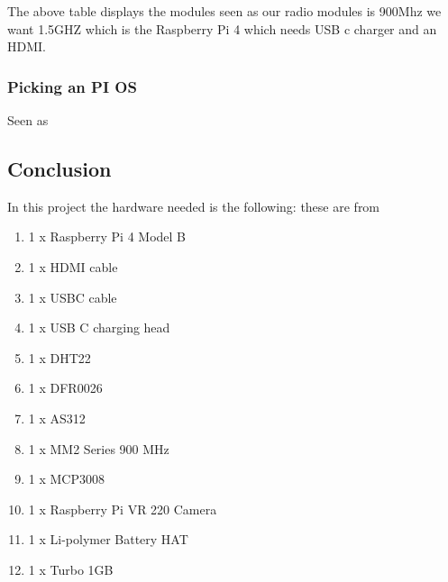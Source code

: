 The above table displays the modules seen as our radio modules is 900Mhz  we want  1.5GHZ which is the Raspberry Pi 4  which needs USB\- c charger and an HDMI.
\subsubsection{Picking an PI OS}
\label{pi os}
Seen as 
\subsection{Conclusion}
In this project the hardware needed is the  following: these are from 
\begin{enumerate}
	\item 1 x Raspberry Pi 4 Model B 
	\item 1 x HDMI cable
	\item 1 x USB\-C cable
	\item 1 x USB \-C charging head
	\item 1 x DHT22
	\item 1 x DFR0026
	\item 1 x AS312
	\item 1 x MM2 Series 900 MHz
	\item 1 x MCP3008
	\item 1 x Raspberry Pi VR 220 Camera
	\item  1 x Li-polymer Battery HAT 
	\item 1 x Turbo 1GB 
	
	
\end{enumerate}